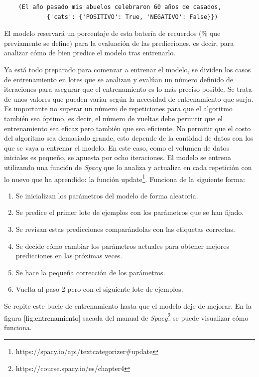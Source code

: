 \begin{verbatim}
	(El año pasado mis abuelos celebraron 60 años de casados, 
			{'cats': {'POSITIVO': True, 'NEGATIVO': False}}) 
\end{verbatim}


El modelo reservará un porcentaje de esta batería de recuerdos (\% que previamente se define) para la evaluación de las predicciones, es decir, para analizar cómo de bien predice el modelo tras entrenarlo. 

Ya está todo preparado para comenzar a entrenar el modelo, se dividen los casos de entrenamiento en lotes que se analizan y evalúan un número definido de iteraciones para asegurar que el entrenamiento es lo más preciso posible. Se trata de unos valores que pueden variar según la necesidad de entrenamiento que surja. Es importante no superar un número de repeticiones para que el algoritmo también sea óptimo, es decir, el número de vueltas debe permitir que el entrenamiento sea eficaz pero también que sea eficiente. No permitir que el costo del algoritmo sea demasiado grande, esto depende de la cantidad de datos con los que se vaya a entrenar el modelo. En este caso, como el volumen de datos iniciales es pequeño, se apuesta por ocho iteraciones. El modelo se entrena utilizando una función de \textit{Spacy} que lo analiza y actualiza en cada repetición con lo nuevo que ha aprendido: la función update\footnote{https://spacy.io/api/textcategorizer\#update}. Funciona de la siguiente forma: 
\begin{enumerate}
	\item Se inicializan los parámetros del modelo de forma aleatoria.
	\item Se predice el primer lote de ejemplos con los parámetros que se han fijado.
	\item Se revisan estas predicciones comparándolas con las etiquetas correctas.
	\item Se decide cómo cambiar los parámetros actuales para obtener mejores predicciones en las próximas veces.
	\item Se hace la pequeña corrección de los parámetros.
	\item Vuelta al paso 2 pero con el siguiente lote de ejemplos.
\end{enumerate}
Se repite este bucle de entrenamiento hasta que el modelo deje de mejorar. En la figura \ref{fig:entrenamiento} sacada del manual de \textit{Spacy}\footnote{https://course.spacy.io/es/chapter4} se puede visualizar cómo funciona. 


